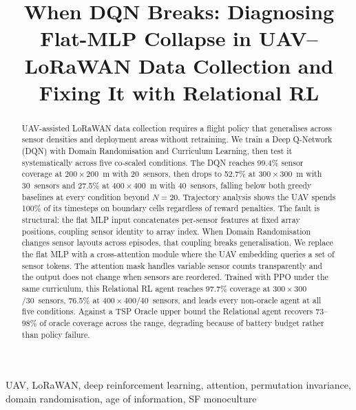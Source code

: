 \documentclass[conference]{IEEEtran}
\begin{document}
\title{When DQN Breaks: Diagnosing Flat-MLP Collapse in UAV--LoRaWAN Data Collection and Fixing It with Relational RL}

\author{
}

\maketitle

\begin{abstract}
UAV-assisted LoRaWAN data collection requires a flight policy that generalises across sensor densities and deployment areas without retraining. We train a Deep Q-Network (DQN) with Domain Randomisation and Curriculum Learning, then test it systematically across five co-scaled conditions. The DQN reaches 99.4\% sensor coverage at $200{\times}200$~m with 20~sensors, then drops to 52.7\% at $300{\times}300$~m with 30~sensors and 27.5\% at $400{\times}400$~m with 40~sensors, falling below both greedy baselines at every condition beyond $N{=}20$. Trajectory analysis shows the UAV spends 100\% of its timesteps on boundary cells regardless of reward penalties. The fault is structural: the flat MLP input concatenates per-sensor features at fixed array positions, coupling sensor identity to array index. When Domain Randomisation changes sensor layouts across episodes, that coupling breaks generalisation. We replace the flat MLP with a cross-attention module where the UAV embedding queries a set of sensor tokens. The attention mask handles variable sensor counts transparently and the output does not change when sensors are reordered. Trained with PPO under the same curriculum, this Relational RL agent reaches 97.7\% coverage at $300{\times}300$/30~sensors, 76.5\% at $400{\times}400$/40~sensors, and leads every non-oracle agent at all five conditions. Against a TSP Oracle upper bound the Relational agent recovers 73--98\% of oracle coverage across the range, degrading because of battery budget rather than policy failure.
\end{abstract}

\begin{IEEEkeywords}
UAV, LoRaWAN, deep reinforcement learning, attention, permutation invariance, domain randomisation, age of information, SF monoculture
\end{IEEEkeywords}
\end{document}
